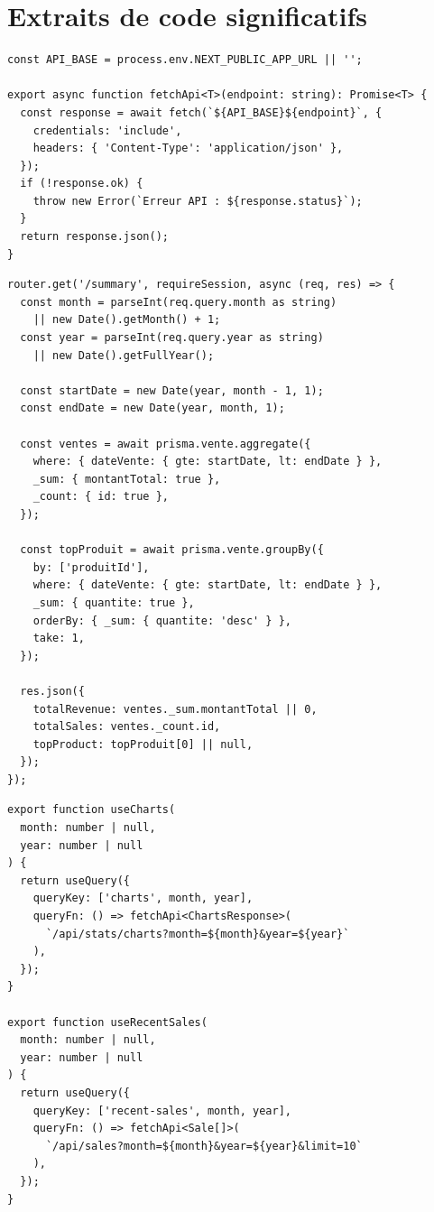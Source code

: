 \documentclass[11pt,a4paper]{report}
\begin{document}
\chapter{Extraits de code significatifs}

\begin{lstlisting}[caption={Wrapper API fetch côté frontend (lib/api.ts)},label={lst:api}]
const API_BASE = process.env.NEXT_PUBLIC_APP_URL || '';

export async function fetchApi<T>(endpoint: string): Promise<T> {
  const response = await fetch(`${API_BASE}${endpoint}`, {
    credentials: 'include',
    headers: { 'Content-Type': 'application/json' },
  });
  if (!response.ok) {
    throw new Error(`Erreur API : ${response.status}`);
  }
  return response.json();
}
\end{lstlisting}

\begin{lstlisting}[caption={Route de statistiques résumées (routes/stats.ts, extrait)},label={lst:stats-route}]
router.get('/summary', requireSession, async (req, res) => {
  const month = parseInt(req.query.month as string)
    || new Date().getMonth() + 1;
  const year = parseInt(req.query.year as string)
    || new Date().getFullYear();

  const startDate = new Date(year, month - 1, 1);
  const endDate = new Date(year, month, 1);

  const ventes = await prisma.vente.aggregate({
    where: { dateVente: { gte: startDate, lt: endDate } },
    _sum: { montantTotal: true },
    _count: { id: true },
  });

  const topProduit = await prisma.vente.groupBy({
    by: ['produitId'],
    where: { dateVente: { gte: startDate, lt: endDate } },
    _sum: { quantite: true },
    orderBy: { _sum: { quantite: 'desc' } },
    take: 1,
  });

  res.json({
    totalRevenue: ventes._sum.montantTotal || 0,
    totalSales: ventes._count.id,
    topProduct: topProduit[0] || null,
  });
});
\end{lstlisting}

\begin{lstlisting}[caption={Hook TanStack Query pour les graphiques (hooks/use-dashboard-data.ts, extrait)},label={lst:hooks}]
export function useCharts(
  month: number | null,
  year: number | null
) {
  return useQuery({
    queryKey: ['charts', month, year],
    queryFn: () => fetchApi<ChartsResponse>(
      `/api/stats/charts?month=${month}&year=${year}`
    ),
  });
}

export function useRecentSales(
  month: number | null,
  year: number | null
) {
  return useQuery({
    queryKey: ['recent-sales', month, year],
    queryFn: () => fetchApi<Sale[]>(
      `/api/sales?month=${month}&year=${year}&limit=10`
    ),
  });
}
\end{lstlisting}
\end{document}
